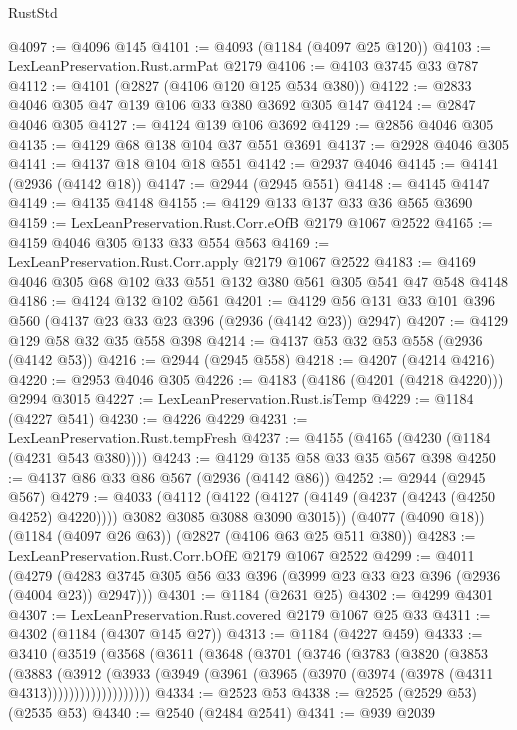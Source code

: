 \begin{lexlean}{RustStd}
\begin{coremodule}
@4097 := @4096 @145
@4101 := @4093 (@1184 (@4097 @25 @120))
@4103 := LexLeanPreservation.Rust.armPat @2179
@4106 := @4103 @3745 @33 @787
@4112 := @4101 (@2827 (@4106 @120 @125 @534 @380))
@4122 := @2833 @4046 @305 @47 @139 @106 @33 @380 @3692 @305 @147
@4124 := @2847 @4046 @305
@4127 := @4124 @139 @106 @3692
@4129 := @2856 @4046 @305
@4135 := @4129 @68 @138 @104 @37 @551 @3691
@4137 := @2928 @4046 @305
@4141 := @4137 @18 @104 @18 @551
@4142 := @2937 @4046
@4145 := @4141 (@2936 (@4142 @18))
@4147 := @2944 (@2945 @551)
@4148 := @4145 @4147
@4149 := @4135 @4148
@4155 := @4129 @133 @137 @33 @36 @565 @3690
@4159 := LexLeanPreservation.Rust.Corr.eOfB @2179 @1067 @2522
@4165 := @4159 @4046 @305 @133 @33 @554 @563
@4169 := LexLeanPreservation.Rust.Corr.apply @2179 @1067 @2522
@4183 := @4169 @4046 @305 @68 @102 @33 @551 @132 @380 @561 @305 @541 @47 @548 @4148
@4186 := @4124 @132 @102 @561
@4201 := @4129 @56 @131 @33 @101 @396 @560 (@4137 @23 @33 @23 @396 (@2936 (@4142 @23)) @2947)
@4207 := @4129 @129 @58 @32 @35 @558 @398
@4214 := @4137 @53 @32 @53 @558 (@2936 (@4142 @53))
@4216 := @2944 (@2945 @558)
@4218 := @4207 (@4214 @4216)
@4220 := @2953 @4046 @305
@4226 := @4183 (@4186 (@4201 (@4218 @4220))) @2994 @3015
@4227 := LexLeanPreservation.Rust.isTemp
@4229 := @1184 (@4227 @541)
@4230 := @4226 @4229
@4231 := LexLeanPreservation.Rust.tempFresh
@4237 := @4155 (@4165 (@4230 (@1184 (@4231 @543 @380))))
@4243 := @4129 @135 @58 @33 @35 @567 @398
@4250 := @4137 @86 @33 @86 @567 (@2936 (@4142 @86))
@4252 := @2944 (@2945 @567)
@4279 := @4033
    (@4112
      (@4122 (@4127 (@4149 (@4237 (@4243 (@4250 @4252) @4220)))) @3082 @3085 @3088 @3090 @3015))
    (@4077 (@4090 @18))
    (@1184 (@4097 @26 @63))
    (@2827 (@4106 @63 @25 @511 @380))
@4283 := LexLeanPreservation.Rust.Corr.bOfE @2179 @1067 @2522
@4299 := @4011
    (@4279 (@4283 @3745 @305 @56 @33 @396 (@3999 @23 @33 @23 @396 (@2936 (@4004 @23)) @2947)))
@4301 := @1184 (@2631 @25)
@4302 := @4299 @4301
@4307 := LexLeanPreservation.Rust.covered @2179 @1067 @25 @33
@4311 := @4302 (@1184 (@4307 @145 @27))
@4313 := @1184 (@4227 @459)
@4333 := @3410
    (@3519
      (@3568
        (@3611
          (@3648
            (@3701
              (@3746
                (@3783
                  (@3820
                    (@3853
                      (@3883
                        (@3912
                          (@3933
                            (@3949
                              (@3961 (@3965 (@3970 (@3974 (@3978 (@4311 @4313)))))))))))))))))))
@4334 := @2523 @53
@4338 := @2525 (@2529 @53) (@2535 @53)
@4340 := @2540 (@2484 @2541)
@4341 := @939 @2039

\end{coremodule}
\end{lexlean}
